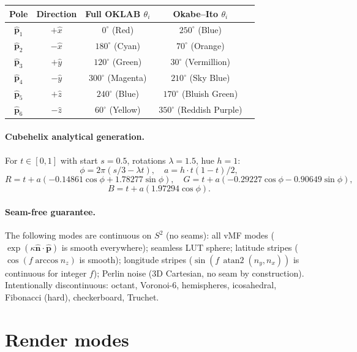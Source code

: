 \documentclass[11pt]{report}
\DeclareMathOperator{\atanTwo}{atan2}
\begin{document}
\begin{center}
\begin{tabular}{ccccc}
\toprule
Pole & Direction & Full OKLAB $\theta_i$ & Okabe--Ito $\theta_i$ \\
\midrule
$\hat{\mathbf p}_1$ & $+\hat x$ & $0^\circ$ (Red) & $250^\circ$ (Blue) \\
$\hat{\mathbf p}_2$ & $-\hat x$ & $180^\circ$ (Cyan) & $70^\circ$ (Orange) \\
$\hat{\mathbf p}_3$ & $+\hat y$ & $120^\circ$ (Green) & $30^\circ$ (Vermillion) \\
$\hat{\mathbf p}_4$ & $-\hat y$ & $300^\circ$ (Magenta) & $210^\circ$ (Sky Blue) \\
$\hat{\mathbf p}_5$ & $+\hat z$ & $240^\circ$ (Blue) & $170^\circ$ (Bluish Green) \\
$\hat{\mathbf p}_6$ & $-\hat z$ & $60^\circ$ (Yellow) & $350^\circ$ (Reddish Purple) \\
\bottomrule
\end{tabular}
\end{center}

\paragraph{Cubehelix analytical generation.} For $t\in[0,1]$ with start $s=0.5$, rotations $\lambda=1.5$, hue $h=1$:
\[
\phi=2\pi(s/3-\lambda t),\quad a=h\cdot t(1-t)/2,
\]
\[
R=t+a(-0.14861\cos\phi+1.78277\sin\phi),\quad G=t+a(-0.29227\cos\phi-0.90649\sin\phi),
\]
\[
B=t+a(1.97294\cos\phi).
\]

\paragraph{Seam-free guarantee.} The following modes are continuous on $S^2$ (no seams): all vMF modes ($\exp(\kappa\hat{\mathbf n}\cdot\hat{\mathbf p})$ is smooth everywhere); seamless LUT sphere; latitude stripes ($\cos(f\arccos n_z)$ is smooth); longitude stripes ($\sin(f\,\atanTwo(n_y,n_x))$ is continuous for integer $f$); Perlin noise (3D Cartesian, no seam by construction). Intentionally discontinuous: octant, Voronoi-6, hemispheres, icosahedral, Fibonacci (hard), checkerboard, Truchet.

\section{Render modes}
\label{sec:render_modes}
\end{document}
